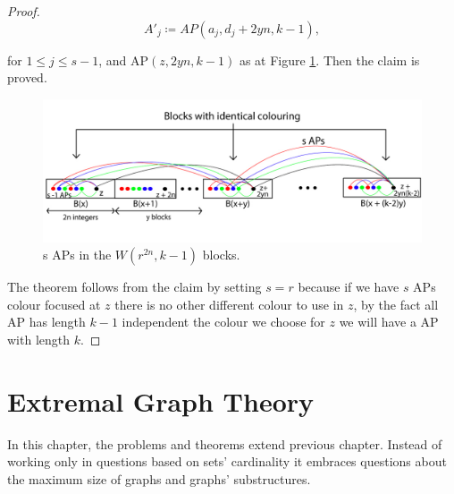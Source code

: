 \documentclass[12pt,twoside,a4paper]{book}
\numberwithin{equation}{section}
\theoremstyle{remark}
\begin{document}
\begin{proof}
$$ A'_j \coloneqq AP(a_j, d_j + 2yn, k-1) , $$

for $1 \leq j \leq s-1$, and AP$(z, 2yn, k-1)$ as at Figure \ref{fig:VanderWaerdenBlocks}. Then the claim is proved.

\begin{figure}[H]
     \centering
     \includegraphics[scale=1.8]{Figuras/Van-der-Waerden-Blocks.jpg}
     \caption{s APs in the $W(r^{2n},k-1)$ blocks.}
     \label{fig:VanderWaerdenBlocks}
\end{figure}

The theorem follows from the claim by setting $s=r$ because if we have $s$  APs colour focused at $z$ there is no other different colour to use in $z$, by the fact all AP has length $k-1$  independent the colour we choose for $z$ we will have a AP with length $k$.

\end{proof}



\chapter{Extremal Graph Theory}
In this chapter, the problems and theorems extend previous chapter. Instead of working only in questions based on sets' cardinality it embraces questions about the maximum size of graphs and graphs' substructures.
\end{document}
